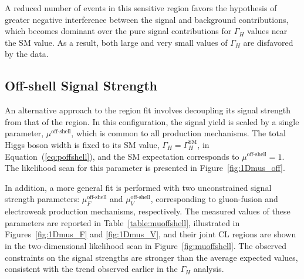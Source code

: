 A reduced number of events in this sensitive region favors the hypothesis of greater negative interference between the signal and background contributions, which becomes dominant over the pure signal contributions for $\Gamma_H$ values near the SM value. As a result, both large and very small values of $\Gamma_H$ are disfavored by the data.

\subsection{Off-shell Signal Strength}


An alternative approach to the \offshell region fit involves decoupling its signal strength from that of the \onshell region. In this configuration, the signal yield is scaled by a single parameter, $\mu^\text{off-shell}$, which is common to all production mechanisms. The total Higgs boson width is fixed to its SM value, $\Gamma_H = \Gamma_H^{\mathrm{SM}}$, in Equation~(\ref{eq:poffshell}), and the SM expectation corresponds to $\mu^\text{off-shell} = 1$. The likelihood scan for this parameter is presented in Figure~\ref{fig:1Dmus_off}.

In addition, a more general fit is performed with two unconstrained signal strength parameters: $\mu^\text{off-shell}_{F}$ and $\mu^\text{off-shell}_{V}$, corresponding to gluon-fusion and electroweak production mechanisms, respectively. The measured values of these parameters are reported in Table~\ref{table:muoffshell}, illustrated in Figures~\ref{fig:1Dmus_F} and \ref{fig:1Dmus_V}, and their joint CL regions are shown in the two-dimensional likelihood scan in Figure~\ref{fig:muoffshell}. The observed constraints on the \offshell signal strengths are stronger than the average expected values, consistent with the trend observed earlier in the $\Gamma_H$ analysis.

